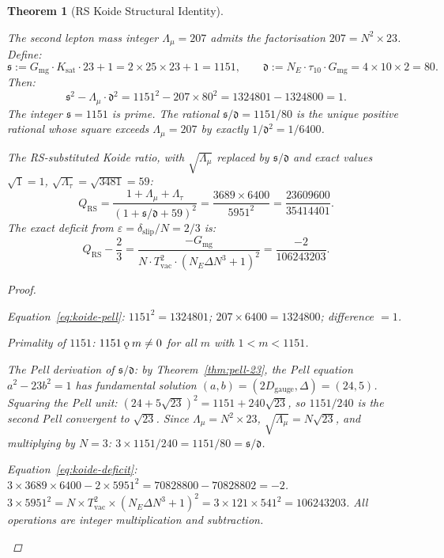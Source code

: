 \documentclass[11pt,letterpaper]{article}
\theoremstyle{plain}
\newtheorem{theorem}{Theorem}[section]
\theoremstyle{definition}
\theoremstyle{remark}
\newcommand{\koppa}{\mathbin{\text{\rm\k{o}}}}
\newcommand{\Dg}{D_{\mathrm{gauge}}}
\newcommand{\Gmg}{G_{\mathrm{mg}}}
\newcommand{\Ksat}{K_{\mathrm{sat}}}
\newcommand{\dslip}{\delta_{\mathrm{slip}}}
\newcommand{\Tvac}{T_{\mathrm{vac}}}
\newcommand{\tauX}{\tau_{10}}
\newcommand{\Lambdamu}{\Lambda_\mu}
\newcommand{\Lambdatau}{\Lambda_\tau}
\begin{document}
\begin{theorem}[RS Koide Structural Identity]\label{thm:koide-structural}
\begin{rsbox}
The second lepton mass integer $\Lambdamu=207$ admits the
factorisation $207=N^2\times23$.  Define:
\[
\mathfrak{s}:=\Gmg\cdot\Ksat\cdot23+1=2\times25\times23+1=1151,
\qquad
\mathfrak{d}:=N_E\cdot\tauX\cdot\Gmg=4\times10\times2=80.
\]
Then:
\begin{equation}
\mathfrak{s}^2-\Lambdamu\cdot\mathfrak{d}^2
=1151^2-207\times80^2=1324801-1324800=1.
\label{eq:koide-pell}
\end{equation}
The integer $\mathfrak{s}=1151$ is prime.  The rational
$\mathfrak{s}/\mathfrak{d}=1151/80$ is the unique positive rational
whose square exceeds $\Lambdamu=207$ by exactly $1/\mathfrak{d}^2
=1/6400$.

The RS-substituted Koide ratio, with $\sqrt{\Lambdamu}$ replaced by
$\mathfrak{s}/\mathfrak{d}$ and exact values $\sqrt{1}=1$,
$\sqrt{\Lambdatau}=\sqrt{3481}=59$:
\[
Q_{\mathrm{RS}}
=\frac{1+\Lambdamu+\Lambdatau}{(1+\mathfrak{s}/\mathfrak{d}+59)^2}
=\frac{3689\times6400}{5951^2}
=\frac{23609600}{35414401}.
\]
The exact deficit from $\varepsilon=\dslip/N=2/3$ is:
\begin{equation}
Q_{\mathrm{RS}}-\frac{2}{3}
=\frac{-\Gmg}{N\cdot\Tvac^2\cdot(N_E\Delta N^3+1)^2}
=\frac{-2}{106243203}.
\label{eq:koide-deficit}
\end{equation}
\end{rsbox}
\begin{proof}
\begin{rsbox}
Equation~\eqref{eq:koide-pell}: $1151^2=1324801$;
$207\times6400=1324800$; difference $=1$.

Primality of $1151$: $1151\koppa m\neq0$ for all $m$ with
$1<m<1151$.

The Pell derivation of $\mathfrak{s}/\mathfrak{d}$: by
Theorem~\ref{thm:pell-23}, the Pell equation $a^2-23b^2=1$ has
fundamental solution $(a,b)=(2\Dg,\Delta)=(24,5)$.  Squaring the
Pell unit: $(24+5\sqrt{23})^2=1151+240\sqrt{23}$, so $1151/240$ is
the second Pell convergent to $\sqrt{23}$.  Since
$\Lambdamu=N^2\times23$, $\sqrt{\Lambdamu}=N\sqrt{23}$, and
multiplying by $N=3$: $3\times1151/240=1151/80=\mathfrak{s}/\mathfrak{d}$.

Equation~\eqref{eq:koide-deficit}:
$3\times3689\times6400-2\times5951^2=70828800-70828802=-2$.
$3\times5951^2=N\times\Tvac^2\times(N_E\Delta N^3+1)^2
=3\times121\times541^2=106243203$.
All operations are integer multiplication and subtraction.
\end{rsbox}
\end{proof}
\end{theorem}
\end{document}

